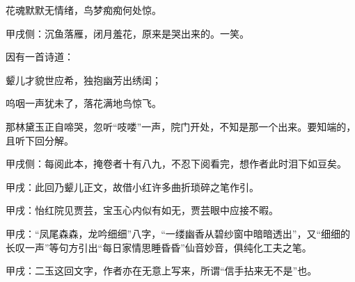 \begin{poem}
    \begin{pl}花魂默默无情绪，鸟梦痴痴何处惊。\end{pl}\begin{note}甲戌侧：沉鱼落雁，闭月羞花，原来是哭出来的。一笑。\end{note}
\end{poem}


\begin{parag}
    因有一首诗道：
\end{parag}


\begin{poem}
    \begin{pl}颦儿才貌世应希，独抱幽芳出绣闺；\end{pl}

    \begin{pl}呜咽一声犹未了，落花满地鸟惊飞。\end{pl}
\end{poem}


\begin{parag}
    那林黛玉正自啼哭，忽听“吱喽”一声，院门开处，不知是那一个出来。要知端的，且听下回分解。\begin{note}甲戌侧：每阅此本，掩卷者十有八九，不忍下阅看完，想作者此时泪下如豆矣。\end{note}
\end{parag}


\begin{parag}
    \begin{note}甲戌：此回乃颦儿正文，故借小红许多曲折琐碎之笔作引。\end{note}
\end{parag}


\begin{parag}
    \begin{note}甲戌：怡红院见贾芸，宝玉心内似有如无，贾芸眼中应接不暇。\end{note}
\end{parag}


\begin{parag}
    \begin{note}甲戌：“凤尾森森，龙吟细细”八字，“一缕幽香从碧纱窗中暗暗透出”，又“细细的长叹一声”等句方引出“每日家情思睡昏昏”仙音妙音，俱纯化工夫之笔。\end{note}
\end{parag}


\begin{parag}
    \begin{note}甲戌：二玉这回文字，作者亦在无意上写来，所谓“信手拈来无不是”也。\end{note}
\end{parag}


